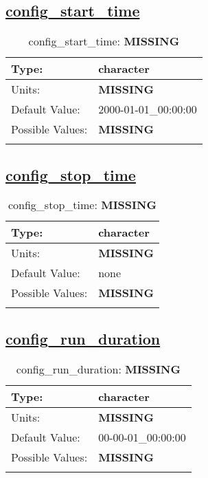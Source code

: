 \subsection[config\_start\_time]{\hyperref[sec:nm_tab_cice_model]{config\_start\_time}}
\label{subsec:nm_sec_config_start_time}
\begin{center}
\begin{longtable}{| p{2.0in} || p{4.0in} |}
    \hline
    Type: & character \\
    \hline
    Units: & {\bf \color{red} MISSING} \\
    \hline
    Default Value: & 2000-01-01\_00:00:00 \\
    \hline
    Possible Values: & {\bf \color{red} MISSING} \\
    \hline
    \caption{config\_start\_time: {\bf \color{red} MISSING}}
\end{longtable}
\end{center}
\subsection[config\_stop\_time]{\hyperref[sec:nm_tab_cice_model]{config\_stop\_time}}
\label{subsec:nm_sec_config_stop_time}
\begin{center}
\begin{longtable}{| p{2.0in} || p{4.0in} |}
    \hline
    Type: & character \\
    \hline
    Units: & {\bf \color{red} MISSING} \\
    \hline
    Default Value: & none \\
    \hline
    Possible Values: & {\bf \color{red} MISSING} \\
    \hline
    \caption{config\_stop\_time: {\bf \color{red} MISSING}}
\end{longtable}
\end{center}
\subsection[config\_run\_duration]{\hyperref[sec:nm_tab_cice_model]{config\_run\_duration}}
\label{subsec:nm_sec_config_run_duration}
\begin{center}
\begin{longtable}{| p{2.0in} || p{4.0in} |}
    \hline
    Type: & character \\
    \hline
    Units: & {\bf \color{red} MISSING} \\
    \hline
    Default Value: & 00-00-01\_00:00:00 \\
    \hline
    Possible Values: & {\bf \color{red} MISSING} \\
    \hline
    \caption{config\_run\_duration: {\bf \color{red} MISSING}}
\end{longtable}
\end{center}
